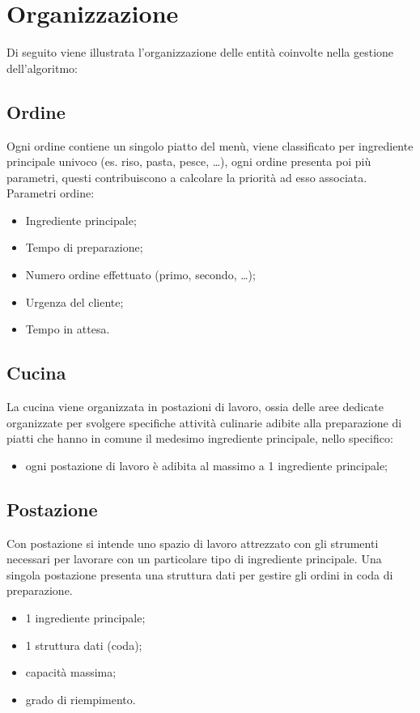 \section{Organizzazione}
Di seguito viene illustrata l’organizzazione delle entità coinvolte nella gestione dell’algoritmo:
\subsection{Ordine}
Ogni ordine contiene un singolo piatto del menù, viene classificato per ingrediente principale univoco (es. riso, pasta, pesce, …), ogni ordine presenta poi più parametri, questi contribuiscono a calcolare la priorità ad esso associata.
Parametri ordine:
\begin{itemize}
	\item Ingrediente principale;
	\item Tempo di preparazione;
	\item Numero ordine effettuato (primo, secondo, …);
	\item Urgenza del cliente;
	\item Tempo in attesa.
\end{itemize}

\subsection{Cucina}
La cucina viene organizzata in postazioni di lavoro, ossia delle aree dedicate organizzate per svolgere specifiche attività culinarie adibite alla preparazione di piatti che hanno in comune il medesimo ingrediente principale, nello specifico:
\begin{itemize}
	\item ogni postazione di lavoro è adibita al massimo a 1 ingrediente principale;
\end{itemize}

\subsection{Postazione}
Con postazione si intende uno spazio di lavoro attrezzato con gli strumenti necessari per lavorare con un particolare tipo di ingrediente principale. Una singola postazione presenta una struttura dati per gestire gli ordini in coda di preparazione.
\begin{itemize}
	\item 1 ingrediente principale;
	\item 1 struttura dati (coda);
	\item capacità massima;
	\item grado di riempimento.
\end{itemize}

\clearpage